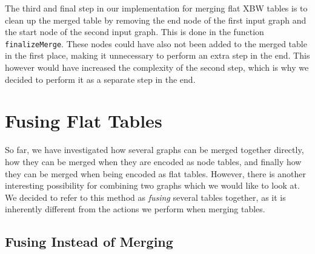 \documentclass[a4paper,12pt,twoside,BCOR=10mm]{scrbook}
\begin{document}
The third and final step in our implementation for merging flat XBW tables 
is to clean up the merged table by removing the end node of the first input graph 
and the start node of the second input graph. 
This is done in the function \texttt{finalizeMerge}. 
These nodes could have also not been added to the merged table in the first place, 
making it unnecessary to perform an extra step in the end. 
This however would have increased the complexity of the second step, which is why we 
decided to perform it as a separate step in the end.


\section{Fusing Flat Tables}
\label{sec:fusing_flat_tables}
%

So far, we have investigated how several graphs can be merged together directly, 
how they can be merged when they are encoded as node tables, 
and finally how they can be merged when being encoded as flat tables. 
However, there is another interesting possibility for 
combining two graphs which we would like to look at. 
We decided to refer to this method as \textit{fusing} several tables together, 
as it is inherently different from the actions we perform when merging tables.

\subsection{Fusing Instead of Merging}
\end{document}
